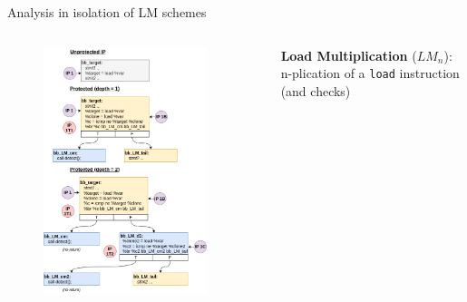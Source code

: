 \begin{frame}[fragile]{Analysis in isolation of LM schemes}
    \begin{columns}
        \begin{column}{0.35\textwidth}
            \begin{figure}
                \includegraphics[scale=0.24]{img/cm-mul-load-full-sepend.drawio.png}
            \end{figure}
            \vfill
        \end{column}
        \begin{column}{0.01\textwidth} \end{column}
        \begin{small}
            \begin{column}{0.65\textwidth}            
                \textbf{Load Multiplication} ($LM_n$): n-plication of a \texttt{load} instruction (and checks)
                    

\end{column}
\end{small}
\end{columns}
\end{frame}

